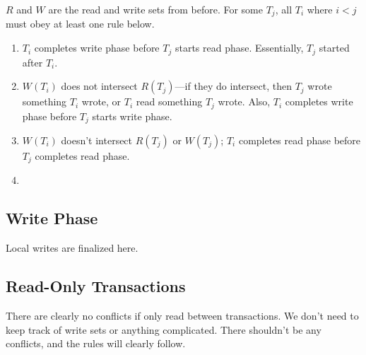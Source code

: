 \documentclass{article}
\begin{document}
$R$ and $W$ are the read and write sets from before. For some $T_j$, all $T_i$ where $i<j$ must obey at least one rule below.

\begin{enumerate}
    \item $T_i$ completes write phase before $T_j$ starts read phase. Essentially, $T_j$ started after $T_i$.
    \item $W(T_i)$ does not intersect $R(T_j)$---if they do intersect, then $T_j$ wrote something $T_i$ wrote, or $T_i$ read something $T_j$ wrote. Also, $T_i$ completes write phase before $T_j$ starts write phase.
    \item $W(T_i)$ doesn't intersect $R(T_j)$ or $W(T_j)$; $T_i$ completes read phase before $T_j$ completes read phase.
    \item
\end{enumerate}

\subsection*{Write Phase}
Local writes are finalized here.

\subsection*{Read-Only Transactions}
There are clearly no conflicts if only read between transactions. We don't need to keep track of write sets or anything complicated. There shouldn't be any conflicts, and the rules will clearly follow.
\end{document}
